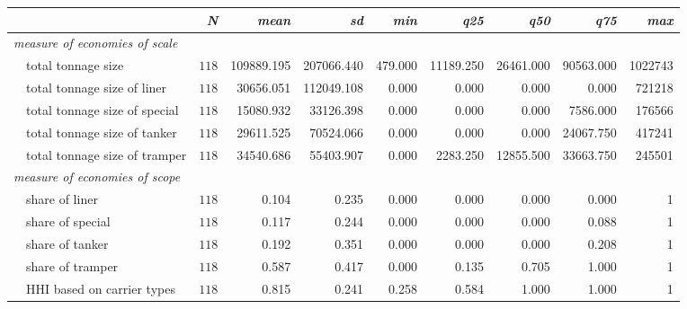 \begin{tabular}{lrrrrrrrr}
\toprule
\multicolumn{1}{l}{\itshape }&\multicolumn{1}{r}{\itshape N}&\multicolumn{1}{r}{\itshape mean}&\multicolumn{1}{r}{\itshape sd}&\multicolumn{1}{r}{\itshape min}&\multicolumn{1}{r}{\itshape q25}&\multicolumn{1}{r}{\itshape q50}&\multicolumn{1}{r}{\itshape q75}&\multicolumn{1}{r}{\itshape max}\tabularnewline
\midrule
{\itshape measure of economies of scale}&&&&&&&&\tabularnewline
~~total tonnage size&$118$&109889.195&207066.440&479.000&11189.250&26461.000&90563.000&1022743\tabularnewline
~~total tonnage size of liner&$118$&30656.051&112049.108&0.000&0.000&0.000&0.000&721218\tabularnewline
~~total tonnage size of special&$118$&15080.932&33126.398&0.000&0.000&0.000&7586.000&176566\tabularnewline
~~total tonnage size of tanker&$118$&29611.525&70524.066&0.000&0.000&0.000&24067.750&417241\tabularnewline
~~total tonnage size of tramper&$118$&34540.686&55403.907&0.000&2283.250&12855.500&33663.750&245501\tabularnewline
\midrule
{\itshape measure of economies of scope}&&&&&&&&\tabularnewline
~~share of liner&$118$&0.104&0.235&0.000&0.000&0.000&0.000&1\tabularnewline
~~share of special&$118$&0.117&0.244&0.000&0.000&0.000&0.088&1\tabularnewline
~~share of tanker&$118$&0.192&0.351&0.000&0.000&0.000&0.208&1\tabularnewline
~~share of tramper&$118$&0.587&0.417&0.000&0.135&0.705&1.000&1\tabularnewline
~~HHI based on carrier types&$118$&0.815&0.241&0.258&0.584&1.000&1.000&1\tabularnewline
\bottomrule
\end{tabular}
